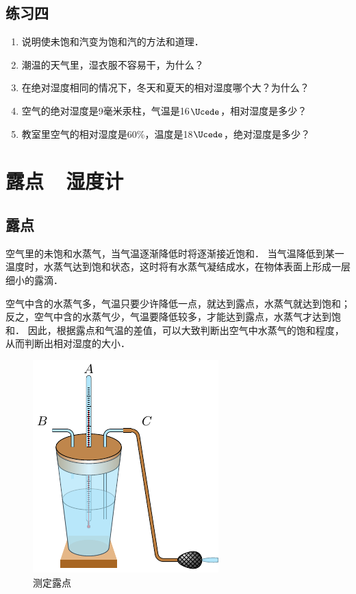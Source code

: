 \subsection*{练习四}

\begin{enumerate}
\item 说明使未饱和汽变为饱和汽的方法和道理．
\item 潮温的天气里，湿衣服不容易干，为什么？
\item 在绝对湿度相同的情况下，冬天和夏天的相对湿度哪个大？为什么？
\item 空气的绝对湿度是9毫米汞柱，气温是16$\Ucede$，相对湿度是多少？
\item 教室里空气的相对湿度是60\%，温度是18$\Ucede$，绝对湿度是多少？
\end{enumerate}

\section{露点~~湿度计}
\subsection{露点} 
空气里的未饱和水蒸气，当气温逐渐降低时将逐渐接近饱和．
当气温降低到某一温度时，水蒸气达到饱和状态，这时将有水蒸气凝结成水，在物体表面上形成一层细小的露滴．


空气中含的水蒸气多，气温只要少许降低一点，就达到露点，水蒸气就达到饱和；反之，空气中含的水蒸气少，气温要降低较多，才能达到露点，水蒸气才达到饱和．
因此，根据露点和气温的差值，可以大致判断出空气中水蒸气的饱和程度，从而判断出相对湿度的大小．
\begin{figure}[htbp]
  \centering
  \includegraphics{fig/B/5-9.pdf}
  \caption{测定露点}\label{fig_B_5-9}
\end{figure}

